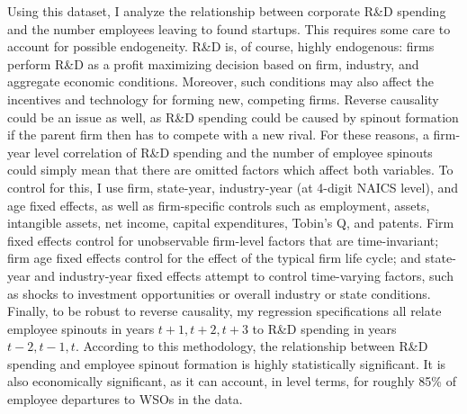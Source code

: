 \documentclass[11pt,english]{article}
\theoremstyle{definition}
\begin{document}
Using this dataset, I analyze the relationship between corporate R\&D spending and the number employees leaving to found startups. This requires some care to account for possible endogeneity. R\&D is, of course, highly endogenous: firms perform R\&D as a profit maximizing decision based on firm, industry, and aggregate economic conditions. Moreover, such conditions may also affect the incentives and technology for forming new, competing firms. Reverse causality could be an issue as well, as R\&D spending could be caused by spinout formation if the parent firm then has to compete with a new rival. For these reasons, a firm-year level correlation of R\&D spending and the number of employee spinouts could simply mean that there are omitted factors which affect both variables. To control for this, I use firm, state-year, industry-year (at 4-digit NAICS level), and age fixed effects, as well as firm-specific controls such as employment, assets, intangible assets, net income, capital expenditures, Tobin's Q, and patents. Firm fixed effects control for unobservable firm-level factors that are time-invariant; firm age fixed effects control for the effect of the typical firm life cycle; and state-year and industry-year fixed effects attempt to control time-varying factors, such as shocks to investment opportunities or overall industry or state conditions. Finally, to be robust to reverse causality, my regression specifications all relate employee spinouts in years $t+1,t+2,t+3$ to R\&D spending in years $t-2,t-1,t$. According to this methodology, the relationship between R\&D spending and employee spinout formation is highly statistically significant. It is also economically significant, as it can account, in level terms, for roughly 85\% of employee departures to WSOs in the data. 
\end{document}
